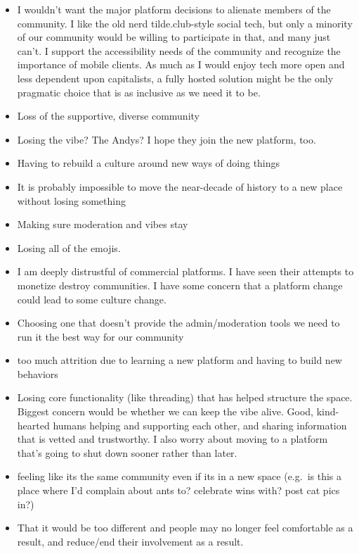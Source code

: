 \documentclass[
]{book}
\providecommand{\tightlist}{%
  \setlength{\itemsep}{0pt}\setlength{\parskip}{0pt}}
\begin{document}
\begin{itemize}
\tightlist
\item
  I wouldn't want the major platform decisions to alienate members of the community. I like the old nerd tilde.club-style social tech, but only a minority of our community would be willing to participate in that, and many just can't. I support the accessibility needs of the community and recognize the importance of mobile clients. As much as I would enjoy tech more open and less dependent upon capitalists, a fully hosted solution might be the only pragmatic choice that is as inclusive as we need it to be.
\item
  Loss of the supportive, diverse community
\item
  Losing the vibe? The Andys? I hope they join the new platform, too.
\item
  Having to rebuild a culture around new ways of doing things
\item
  It is probably impossible to move the near-decade of history to a new place without losing something
\item
  Making sure moderation and vibes stay
\item
  Losing all of the emojis.
\item
  I am deeply distrustful of commercial platforms. I have seen their attempts to monetize destroy communities. I have some concern that a platform change could lead to some culture change.
\item
  Choosing one that doesn't provide the admin/moderation tools we need to run it the best way for our community
\item
  too much attrition due to learning a new platform and having to build new behaviors
\item
  Losing core functionality (like threading) that has helped structure the space. Biggest concern would be whether we can keep the vibe alive. Good, kind-hearted humans helping and supporting each other, and sharing information that is vetted and trustworthy. I also worry about moving to a platform that's going to shut down sooner rather than later.
\item
  feeling like its the same community even if its in a new space (e.g.~is this a place where I'd complain about ants to? celebrate wins with? post cat pics in?)
\item
  That it would be too different and people may no longer feel comfortable as a result, and reduce/end their involvement as a result.
\end{itemize}
\end{document}
